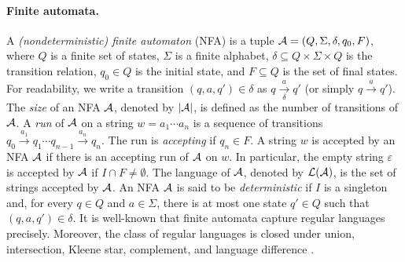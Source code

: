 \paragraph*{Finite automata.} 
A \emph{(nondeterministic) finite automaton} (NFA)  is a tuple $\mathcal{A}=(Q, \Sigma, \delta, q_0, F)$, where $Q$ is a finite set of states, $\Sigma$ is a finite alphabet, $\delta \subseteq Q \times \Sigma \times Q$ is the transition relation, $q_0 \in Q$ is the initial state, and $F \subseteq Q$ is the set of final states. For readability, we write a transition $(q, a, q') \in \delta$ as $q \xrightarrow[\delta]{a} q'$ (or simply $q \xrightarrow{a} q'$). %
The \emph{size} of an NFA $\mathcal{A}$, denoted by $|\mathcal{A}|$, is defined as the number of transitions of $\mathcal{A}$.
%
A \emph{run} of $\mathcal{A}$ on a string $w = a_1 \cdots a_n$ is a sequence of transitions $q_0 \xrightarrow{a_1} q_1 \cdots q_{n-1} \xrightarrow{a_n} q_n$. The run is \emph{accepting} if $q_n \in F$.
A string $w$ is accepted by an NFA $\mathcal{A}$ if there is an accepting run of $\mathcal{A}$ on $w$. In particular, the empty string $\varepsilon$ is accepted by $\mathcal{A}$ if $I \cap F \neq \emptyset$. The language of $\mathcal{A}$, denoted by $\mathcal{L}(\mathcal{A})$, is the set of strings accepted by $\mathcal{A}$. 
%
An NFA $\mathcal{A}$ is said to be \emph{deterministic} if $I$ is a singleton and, for every $q \in Q$ and $a \in \Sigma$, there is at most one state $q' \in Q$ such that $(q, a, q') \in \delta$.
%
It is well-known that finite automata capture regular languages precisely. Moreover, the class of regular languages is closed under union, intersection, Kleene star, complement, and language difference \cite{HU79}.  





